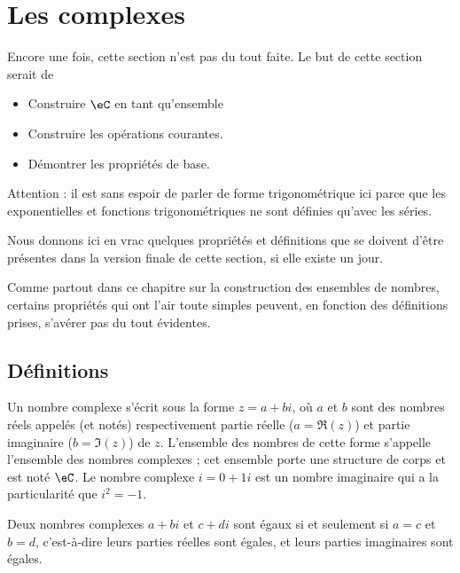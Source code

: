 \section{Les complexes}

\begin{probleme}
    Encore une fois, cette section n'est pas du tout faite. Le but de cette section serait de
    \begin{itemize}
        \item Construire \( \eC\) en tant qu'ensemble
        \item Construire les opérations courantes.
        \item Démontrer les propriétés de base.
    \end{itemize}
    Attention : il est sans espoir de parler de forme trigonométrique ici parce que les exponentielles et fonctions trigonométriques ne sont définies qu'avec les séries.

    Nous donnons ici en vrac quelques propriétés et définitions que se doivent d'être présentes dans la version finale de cette section, si elle existe un jour.

    Comme partout dans ce chapitre sur la construction des ensembles de nombres, certains propriétés qui ont l'air toute simples peuvent, en fonction des définitions prises, s'avérer pas du tout évidentes.
\end{probleme}


 \subsection{Définitions}
 Un nombre complexe s'écrit sous la forme $z = a + b i$, où $a$ et $b$
 sont des nombres réels appelés (et notés) respectivement partie réelle
 ($a = \Re(z)$) et partie imaginaire ($b = \Im(z)$) de $z$. L'ensemble
 des nombres de cette forme s'appelle l'ensemble des nombres complexes
 ; cet ensemble porte une structure de corps et est noté $\eC$. Le
 nombre complexe $i = 0 + 1 i$ est un nombre imaginaire qui a la
 particularité que $i^2 = -1$.

 Deux nombres complexes $a + bi$ et $c + di$ sont égaux si et seulement
 si $a = c$ et $b = d$, c'est-à-dire leurs parties réelles sont égales,
 et leurs parties imaginaires sont égales.

